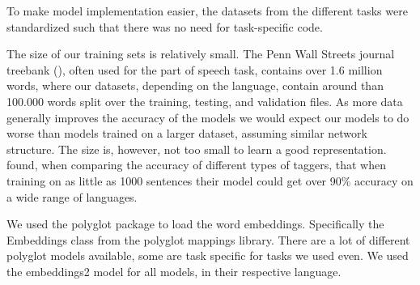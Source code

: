 To make model implementation easier, the datasets from the different tasks were
standardized such that there was no need for task-specific code.

The size of our training sets is relatively small. The Penn Wall Streets journal
treebank (\cite{wsj}), often used for the part of speech task, contains over 1.6
million words, where our datasets, depending on the language, contain around
than 100.000 words split over the training, testing, and validation files. As
more data generally improves the accuracy of the models we would expect our
models to do worse than models trained on a larger dataset, assuming similar
network structure. The size is, however, not too small to learn a good
representation.~\cite{plank2016multilingual} found, when comparing the accuracy
of different types of taggers, that when training on as little as 1000 sentences
their model could get over 90\% accuracy on a wide range of languages.

We used the polyglot package to load the word embeddings. Specifically the
Embeddings class from the polyglot mappings library. There are a lot of
different polyglot models available, some are task specific for tasks we used
even. We used the embeddings2 model for all models, in their respective
language. 

\pagebreak
